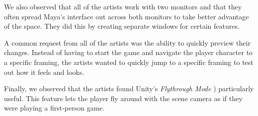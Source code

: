We also observed that all of the artists work with two monitors and that they often spread Maya's interface out across both monitors to take better advantage of the space. They did this by creating separate windows for certain features. 

A common request from all of the artists was the ability to quickly preview their changes. Instead of having to start the game and navigate the player character to a specific framing, the artists wanted to quickly jump to a specific framing to test out how it feels and looks.

Finally, we observed that the artists found Unity's \textit{Flythrough Mode} \cite{unity_flyMode}) particularly useful. This feature lets the player fly around with the scene camera as if they were playing a first-person game.





